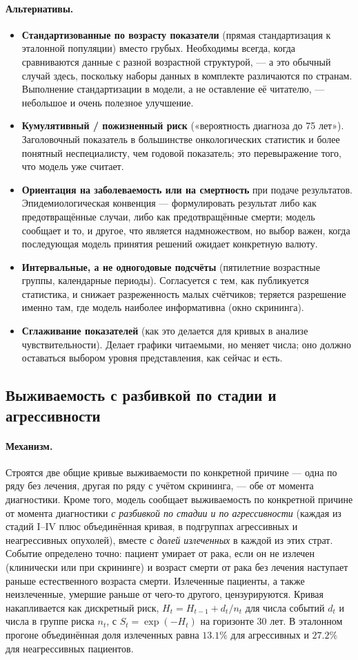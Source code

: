\documentclass[12pt,a4paper]{article}
\newcommand{\mech}[1]{\paragraph{Механизм.} #1}
\newcommand{\alt}[1]{\paragraph{Альтернативы.} #1}
\begin{document}
\alt{\begin{itemize}[nosep]
  \item \textbf{Стандартизованные по возрасту показатели} (прямая стандартизация к эталонной популяции)
        вместо грубых. Необходимы всегда, когда сравниваются данные с разной возрастной структурой, ---
        а это обычный случай здесь, поскольку наборы данных в комплекте различаются по странам. Выполнение
        стандартизации в модели, а не оставление её читателю, --- небольшое и очень полезное улучшение.
  \item \textbf{Кумулятивный / пожизненный риск} («вероятность диагноза до 75 лет»). Заголовочный показатель
        в большинстве онкологических статистик и более понятный неспециалисту, чем годовой показатель; это
        перевыражение того, что модель уже считает.
  \item \textbf{Ориентация на заболеваемость или на смертность} при подаче результатов. Эпидемиологическая
        конвенция --- формулировать результат либо как предотвращённые случаи, либо как предотвращённые
        смерти; модель сообщает и то, и другое, что является надмножеством, но выбор важен, когда
        последующая модель принятия решений ожидает конкретную валюту.
  \item \textbf{Интервальные, а не одногодовые подсчёты} (пятилетние возрастные группы, календарные
        периоды). Согласуется с тем, как публикуется статистика, и снижает разреженность малых счётчиков;
        теряется разрешение именно там, где модель наиболее информативна (окно скрининга).
  \item \textbf{Сглаживание показателей} (как это делается для кривых в анализе чувствительности). Делает
        графики читаемыми, но меняет числа; оно должно оставаться выбором уровня представления, как сейчас и
        есть.
\end{itemize}}

\subsection{Выживаемость с разбивкой по стадии и агрессивности}
\label{sec:survival}

\mech{Строятся две общие кривые выживаемости по конкретной причине --- одна по ряду без лечения, другая по
ряду с учётом скрининга, --- обе от момента диагностики. Кроме того, модель сообщает выживаемость по
конкретной причине от момента диагностики \emph{с разбивкой по стадии и по агрессивности} (каждая из стадий
I--IV плюс объединённая кривая, в подгруппах агрессивных и неагрессивных опухолей), вместе с \emph{долей
излеченных} в каждой из этих страт. Событие определено точно: пациент умирает от рака, если он не излечен
(клинически или при скрининге) и возраст смерти от рака без лечения наступает раньше естественного возраста
смерти. Излеченные пациенты, а также неизлеченные, умершие раньше от чего-то другого, цензурируются. Кривая
накапливается как дискретный риск, $H_t = H_{t-1} + d_t/n_t$ для числа событий $d_t$ и числа в группе риска
$n_t$, с $S_t = \exp(-H_t)$ на горизонте 30 лет. В эталонном прогоне объединённая доля излеченных равна
$13.1\%$ для агрессивных и $27.2\%$ для неагрессивных пациентов.}
\end{document}
